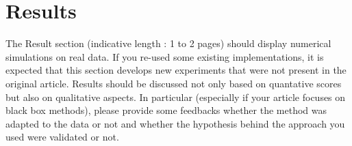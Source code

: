 \documentclass[11pt]{article}
\begin{document}
\section{Results}
The Result section (indicative length : 1 to 2 pages) should display numerical simulations on real data. If you re-used some existing implementations, it is expected that this section develops new experiments that were not present in the original article. Results should be discussed not only based on quantative scores but also on qualitative aspects. In particular (especially if your article focuses on black box methods), please provide some feedbacks whether the method was adapted to the data or not and whether the hypothesis behind the approach you used were validated or not.
\end{document}
